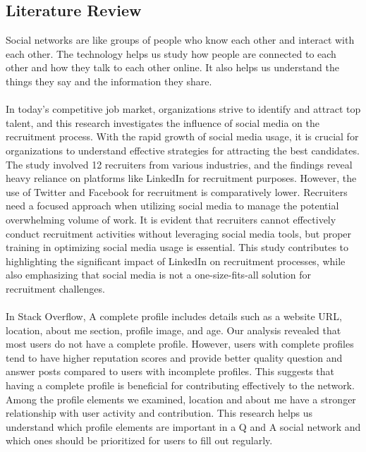 \subsection{Literature Review}
Social networks are like groups of people who know each other and interact with each other. The technology helps us study how people are connected to each other and how they talk to each other online. It also helps us understand the things they say and the information they share.\cite{korshunov2014social}\\\\
In today's competitive job market, organizations strive to identify and attract top talent, and this research investigates the influence of social media on the recruitment process. With the rapid growth of social media usage, it is crucial for organizations to understand effective strategies for attracting the best candidates. The study involved 12 recruiters from various industries, and the findings reveal heavy reliance on platforms like LinkedIn for recruitment purposes. However, the use of Twitter and Facebook for recruitment is comparatively lower. Recruiters need a focused approach when utilizing social media to manage the potential overwhelming volume of work. It is evident that recruiters cannot effectively conduct recruitment activities without leveraging social media tools, but proper training in optimizing social media usage is essential. This study contributes to highlighting the significant impact of LinkedIn on recruitment processes, while also emphasizing that social media is not a one-size-fits-all solution for recruitment challenges.\cite{koch2018impact}\\\\
In Stack Overflow, A complete profile includes details such as a website URL, location, about me section, profile image, and age. Our analysis revealed that most users do not have a complete profile. However, users with complete profiles tend to have higher reputation scores and provide better quality question and answer posts compared to users with incomplete profiles. This suggests that having a complete profile is beneficial for contributing effectively to the network. Among the profile elements we examined, location and about me have a stronger relationship with user activity and contribution. This research helps us understand which profile elements are important in a Q and A social network and which ones should be prioritized for users to fill out regularly.\cite{adaji2016towards}\\\\
